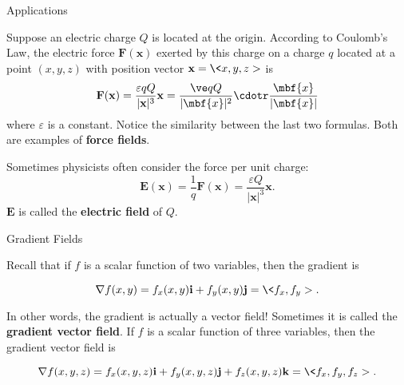 \documentclass[11pt,english,
handout
]{beamer}
\begin{document}
\begin{frame}[t]{Applications}
\small
\begin{example}
Suppose an electric charge $Q$ is located at the origin. According to Coulomb's Law, the electric force $\mathbf{F}(\mathbf{x})$ exerted by this charge on a charge $q$ located at a point $(x,y,z)$ with position vector $\mathbf{x}=\<x,y,z>$ is
\[
\mathbf{F}(\mathbf{x})=\frac{\varepsilon qQ}{|\mathbf{x}|^3}\mathbf{x}=\frac{\ve qQ}{|\mbf{x}|^2}\cdotr\frac{\mbf{x}}{|\mbf{x}|}
\]
where $\varepsilon$ is a constant. \pause Notice the similarity between the last two formulas. \pause Both are examples of \textbf{force fields}.\pause 

\lspace
Sometimes physicists often consider the force per unit charge:
\[
\mathbf{E}(\mathbf{x})=\frac{1}{q}\mathbf{F}(\mathbf{x})=\frac{\varepsilon Q}{|\mathbf{x}|^3}\mathbf{x}.
\]
$\mathbf{E}$ is called the \textbf{electric field} of $Q$.
\end{example}
\end{frame}













\begin{frame}[t]{Gradient Fields}

Recall that if $f$ is a scalar function of two variables, then the gradient is

\[
\nabla f(x,y)=f_x(x,y)\mathbf{i}+f_y(x,y)\mathbf{j}=\<f_x,f_y>.
\]\pause

In other words, the gradient is actually a vector field! \pause Sometimes it is called the \textbf{gradient vector field}. If $f$ is a scalar function of three variables, then the gradient vector field is 

\[
\nabla f(x,y,z)=f_x(x,y,z)\mathbf{i}+f_y(x,y,z)\mathbf{j}+f_z(x,y,z)\mathbf{k}=\<f_x,f_y,f_z>.
\]
\end{frame}
\end{document}
